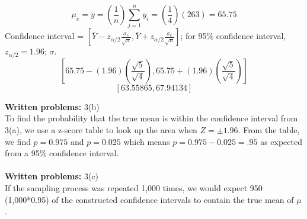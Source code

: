 \documentclass [12pt] {article}
\begin{document}
\[ \mu_e = \bar{y} = (\frac{1}{n})\sum_{j=1}^{n}y_{i} = (\frac{1}{4})(263) = 65.75 \]
Confidence interval = $[\bar{Y}-z_{\alpha/2}\frac{\sigma_e}{\sqrt{n}}, \bar{Y}+z_{\alpha/2}\frac{\sigma_e}{\sqrt{n}}]$; for 95\% confidence interval, $z_{\alpha/2} = 1.96$; $\sigma$.
\[ [65.75-(1.96)(\frac{\sqrt{5}}{\sqrt{4}}), 65.75+(1.96)(\frac{\sqrt{5}}{\sqrt{4}})] \]
\[ [63.55865, 67.94134] \]

\noindent \textbf{Written problems:} 3(b)\\
To find the probability that the true mean is within the confidence interval from 3(a), we use a z-score table to look up the area when $Z=\pm1.96$. From the table, we find $p= 0.975$ and $p=0.025$ which means $p = 0.975 - 0.025 = .95$ as expected from a 95\% confidence interval.\\
\\
\noindent \textbf{Written problems:} 3(c)\\
If the sampling process was repeated 1,000 times, we would expect 950 (1,000*0.95) of the constructed confidence intervals to contain the true mean of $\mu$.
\end{document}
